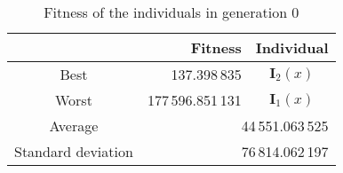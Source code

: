 \begin{table}[ht!]
  \centering
  \begin{tabular}{c|r|c}
    \hline
    	& \textbf{Fitness}	& \textbf{Individual}	\\
    \hline
    Best	& 137.398\,835	& \(\mathbf{I}_2(x)\)	\\
    Worst	& 177\,596.851\,131	& \(\mathbf{I}_1(x)\)	\\
    \hline
    \hline
    Average	& \multicolumn{2}{r|}{44\,551.063\,525}	\\
    \hline
    Standard deviation	& \multicolumn{2}{r|}{76\,814.062\,197}	\\
    \hline
  \end{tabular}
  \caption{Fitness of the individuals in generation 0}
  \label{tab:bg:gp:sym:init:pop:summary}
\end{table}